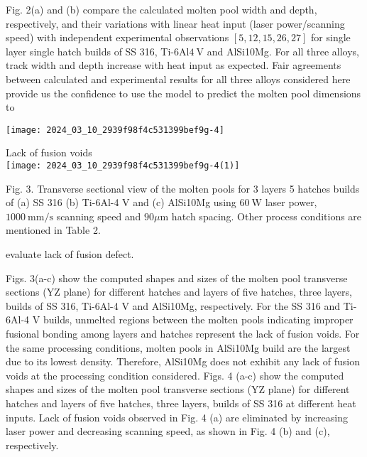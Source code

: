 \documentclass[10pt]{article}
\begin{document}
Fig. 2(a) and (b) compare the calculated molten pool width and depth, respectively, and their variations with linear heat input (laser power/scanning speed) with independent experimental observations $[5,12,15,26,27]$ for single layer single hatch builds of SS 316, Ti-6Al$4 \mathrm{~V}$ and AlSi10Mg. For all three alloys, track width and depth increase with heat input as expected. Fair agreements between calculated and experimental results for all three alloys considered here provide us the confidence to use the model to predict the molten pool dimensions to

\begin{center}
\texttt{[image: 2024\_03\_10\_2939f98f4c531399bef9g-4]}
\end{center}

Lack of fusion voids\\
\texttt{[image: 2024\_03\_10\_2939f98f4c531399bef9g-4(1)]}

Fig. 3. Transverse sectional view of the molten pools for 3 layers 5 hatches builds of (a) SS 316 (b) Ti-6Al-4 V and (c) AlSi10Mg using $60 \mathrm{~W}$ laser power, $1000 \mathrm{~mm} / \mathrm{s}$ scanning speed and $90 \mu \mathrm{m}$ hatch spacing. Other process conditions are mentioned in Table 2.

evaluate lack of fusion defect.

Figs. 3(a-c) show the computed shapes and sizes of the molten pool transverse sections (YZ plane) for different hatches and layers of five hatches, three layers, builds of SS 316, Ti-6Al-4 V and AlSi10Mg, respectively. For the SS 316 and Ti-6Al-4 V builds, unmelted regions between the molten pools indicating improper fusional bonding among layers and hatches represent the lack of fusion voids. For the same processing conditions, molten pools in AlSi10Mg build are the largest due to its lowest density. Therefore, AlSi10Mg does not exhibit any lack of fusion voids at the processing condition considered. Figs. 4 (a-c) show the computed shapes and sizes of the molten pool transverse sections (YZ plane) for different hatches and layers of five hatches, three layers, builds of SS 316 at different heat inputs. Lack of fusion voids observed in Fig. 4 (a) are eliminated by increasing laser power and decreasing scanning speed, as shown in Fig. 4 (b) and (c), respectively.
\end{document}
